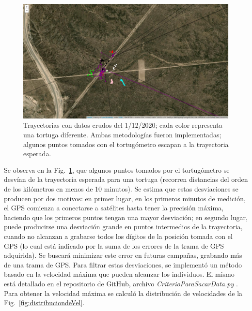 \begin{figure}[ht]
    \begin{center}
       
   
    \includegraphics[width=\imsize]{Chap2/Traye1_12_sinF.png}
\end{center}
    \caption[Trayectorias un día de medición, sin filtrar.]{Trayectorias con datos crudos del 1/12/2020; cada color representa una tortuga diferente. Ambas metodologías fueron implementadas; algunos puntos tomados con el tortugómetro escapan a la trayectoria esperada.}
    \label{fig:trayeSinFiltr}
\end{figure}
Se observa en la Fig.~\ref{fig:trayeSinFiltr}, que algunos puntos tomados por el tortugómetro se desvían de la trayectoria esperada para una tortuga (recorren distancias del orden de los kilómetros en menos de 10 minutos). Se estima que estas desviaciones se producen por dos motivos: en primer lugar, en los primeros minutos de medición, el GPS comienza a conectarse a satélites hasta tener la precisión máxima, haciendo que  los primeros puntos tengan una mayor desviación; en segundo lugar, puede producirse una desviación grande en puntos intermedios de la trayectoria, cuando no alcanzan a grabarse todos los dígitos de la posición tomada con el GPS (lo cual está indicado por la suma de los errores de la trama de GPS adquirida). Se buscará minimizar este error en futuras campañas, grabando más de una trama de GPS. Para filtrar estas desviaciones, se implementó un método basado en la velocidad máxima que pueden alcanzar los individuos. El mismo está detallado en el repositorio de GitHub, archivo \textit{CriterioParaSacarData.py} \cite{github}. Para obtener la velocidad máxima se calculó la distribución de velocidades de la Fig.~\ref{fig:distribuciondeVel}.
 

